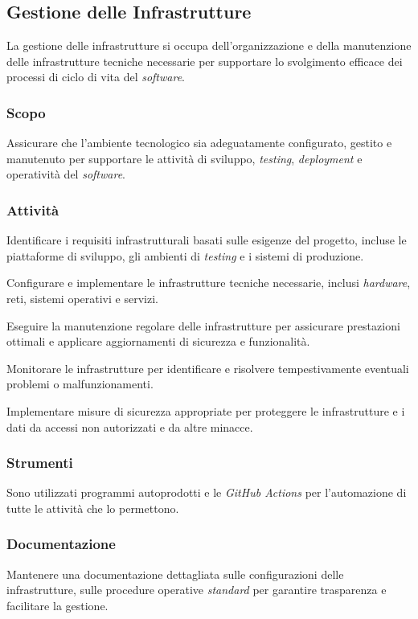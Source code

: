 \subsection{Gestione delle Infrastrutture}

La gestione delle infrastrutture si occupa dell'organizzazione e della
manutenzione delle infrastrutture tecniche necessarie per supportare lo
svolgimento efficace dei processi di ciclo di vita del \textit{software}.

\subsubsection{Scopo}
Assicurare che l'ambiente tecnologico sia adeguatamente configurato, gestito e
manutenuto per supportare le attività di sviluppo, \textit{testing},
\textit{deployment} e operatività del \textit{software}.

\subsubsection{Attività}
Identificare i requisiti
	  infrastrutturali basati sulle esigenze del progetto, incluse le
	  piattaforme di sviluppo, gli ambienti di \textit{testing} e i sistemi
	  di produzione.

Configurare e implementare
	  le infrastrutture tecniche necessarie, inclusi \textit{hardware},
	  reti, sistemi operativi e servizi.

Eseguire la manutenzione
	  regolare delle infrastrutture per assicurare prestazioni ottimali e
	  applicare aggiornamenti di sicurezza e funzionalità.
	  
Monitorare le
	  infrastrutture per identificare e risolvere tempestivamente eventuali
	  problemi o malfunzionamenti.

Implementare misure di sicurezza
	  appropriate per proteggere le infrastrutture e i dati da accessi non
	  autorizzati e da altre minacce.

\subsubsection{Strumenti}
Sono utilizzati programmi autoprodotti e le \textit{GitHub Actions} per
l'automazione di tutte le attività che lo permettono.

\subsubsection{Documentazione}
Mantenere una documentazione dettagliata sulle configurazioni delle
infrastrutture, sulle procedure operative \textit{standard} per garantire trasparenza e
facilitare la gestione.
